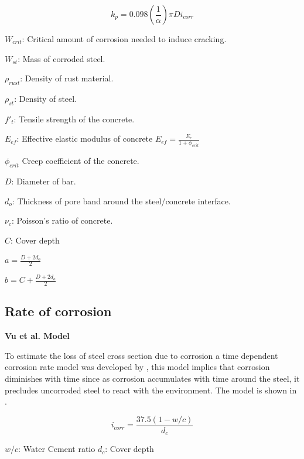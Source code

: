 \begin{equation}
  k_p=0.098 (\frac{1}{\alpha})\pi Di_{corr}
  \label{eq.six}
\end{equation} 

$W_{crit}$: Critical amount of corrosion needed to induce cracking.

$W_{st}$: Mass of corroded steel.

$\rho_{rust}$: Density of rust material.

$\rho_{st}$: Density of steel.

$f'_t$: Tensile strength of the concrete. 

$E_{ef}$: Effective elastic modulus of concrete $E_{ef}=\frac{E_c}{1+\phi_{crit}}$ 

$\phi_{crit}$ Creep coefficient of the concrete.

$D$: Diameter of bar.

$d_o$: Thickness of pore band around the steel/concrete interface.

$\nu_c$: Poisson's ratio of concrete.

$C$: Cover depth

$a=\frac{D+2d_o}{2}$

$b=C+\frac{D+2d_o}{2}$

\subsection{Rate of corrosion}

\textbf{Vu et al. Model }
\newline

To estimate the loss of steel cross section due to corrosion a time dependent corrosion rate model was developed by \cite{Vu2000}, this model implies that corrosion diminishes with time since as corrosion accumulates with time around the steel, it precludes uncorroded steel to react with the environment. The model is shown in .

\begin{equation}
  i_{corr}=\frac{37.5(1-w/c)}{d_c}
  \label{eq.eight}
\end{equation} 

$w/c$: Water Cement ratio
$d_c$: Cover depth

